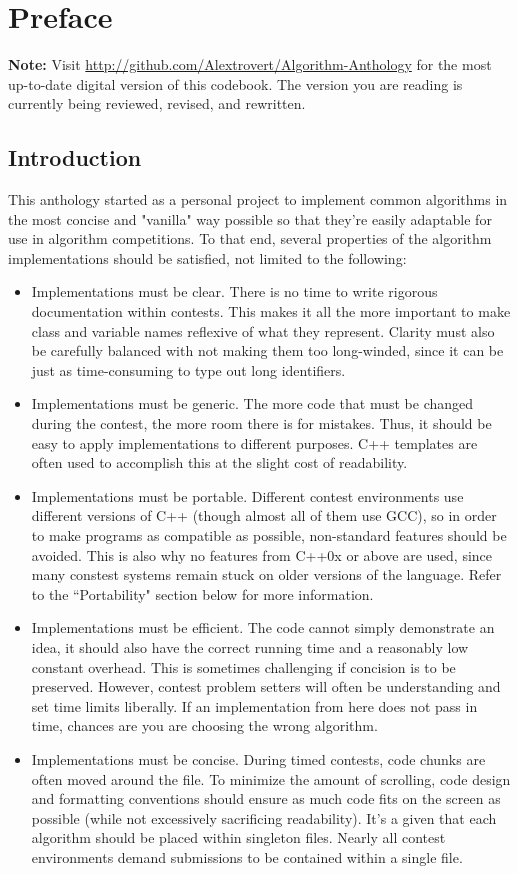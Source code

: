 \chapter{Preface}

\raggedright
\setlength{\parskip}{0.5em}

\textbf{Note:} Visit \url{http://github.com/Alextrovert/Algorithm-Anthology} for the most up-to-date digital version of this codebook. The version you are reading is currently being reviewed, revised, and rewritten.

\section{Introduction}

This anthology started as a personal project to implement common algorithms in the most concise and "vanilla" way possible so that they're easily adaptable for use in algorithm competitions. To that end, several properties of the algorithm implementations should be satisfied, not limited to the following:
\begin{itemize}
	\item Implementations must be clear. There is no time to write rigorous documentation within contests. This makes it all the more important to make class and variable names reflexive of what they represent. Clarity must also be carefully balanced with not making them too long-winded, since it can be just as time-consuming to type out long identifiers.
	\item Implementations must be generic. The more code that must be changed during the contest, the more room there is for mistakes. Thus, it should be easy to apply implementations to different purposes. C++ templates are often used to accomplish this at the slight cost of readability.
	\item Implementations must be portable. Different contest environments use different versions of C++ (though almost all of them use GCC), so in order to make programs as compatible as possible, non-standard features should be avoided. This is also why no features from C++0x or above are used, since many constest systems remain stuck on older versions of the language. Refer to the ``Portability" section below for more information.
	\item Implementations must be efficient. The code cannot simply demonstrate an idea, it should also have the correct running time and a reasonably low constant overhead. This is sometimes challenging if concision is to be preserved. However, contest problem setters will often be understanding and set time limits liberally. If an implementation from here does not pass in time, chances are you are choosing the wrong algorithm.
	\item Implementations must be concise. During timed contests, code chunks are often moved around the file. To minimize the amount of scrolling, code design and formatting conventions should ensure as much code fits on the screen as possible (while not excessively sacrificing readability). It's a given that each algorithm should be placed within singleton files. Nearly all contest environments demand submissions to be contained within a single file.
\end{itemize}
